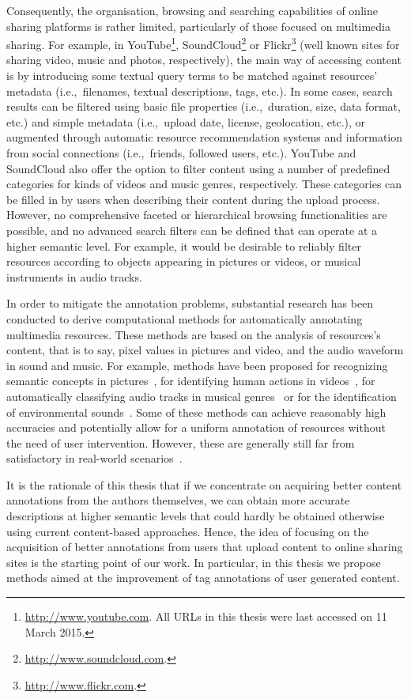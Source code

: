 Consequently, the organisation, browsing and searching capabilities of online sharing platforms is rather limited, particularly of those focused on multimedia sharing. 
For example, in YouTube\footnote{\url{http://www.youtube.com}. All URLs in this thesis were last accessed on 11 March 2015.}, SoundCloud\footnote{\url{http://www.soundcloud.com}.} or Flickr\footnote{\url{http://www.flickr.com}.} (well known sites for sharing video, music and photos, respectively), the main way of accessing content is by introducing some textual query terms to be matched against resources' metadata (i.e.,~filenames, textual descriptions, tags, etc.). In some cases, search results can be filtered using basic file properties (i.e.,~duration, size, data format, etc.) and simple metadata (i.e.,~upload date, license, geolocation, etc.), or augmented through automatic resource recommendation systems and information from social connections (i.e.,~friends, followed users, etc.). YouTube and SoundCloud also offer the option to filter content using a number of predefined categories for kinds of videos and music genres, respectively. These categories can be filled in by users when describing their content during the upload process.
However, no comprehensive faceted or hierarchical browsing functionalities are possible, and no advanced search filters can be defined that can operate at a higher semantic level. For example, it would be desirable to reliably filter resources according to objects appearing in pictures or videos, or musical instruments in audio tracks.

In order to mitigate the annotation problems, substantial research has been conducted to derive computational methods for automatically annotating multimedia resources. These methods are based on the analysis of resources's content, that is to say, pixel values in pictures and video, and the audio waveform in sound and music. For example, methods have been proposed for recognizing semantic concepts in pictures~\citep{Li2006}, for identifying human actions in videos~\citep{Poppe2010}, for automatically classifying audio tracks in musical genres~\citep{Scaringella2006} or for the identification of environmental sounds~\citep{Chachada2013}.
Some of these methods can achieve reasonably high accuracies and potentially allow for a uniform annotation of resources without the need of user intervention. However, these are generally still far from satisfactory in real-world scenarios~\citep{Wang2012}.

It is the rationale of this thesis that if we concentrate on acquiring better content annotations from the authors themselves, we can obtain more accurate descriptions at higher semantic levels that could hardly be obtained otherwise using current content-based approaches. 
Hence, the idea of focusing on the acquisition of better annotations from users that upload content to online sharing sites is the starting point of our work. 
In particular, in this thesis we propose methods aimed at the improvement of tag annotations of user generated content.

